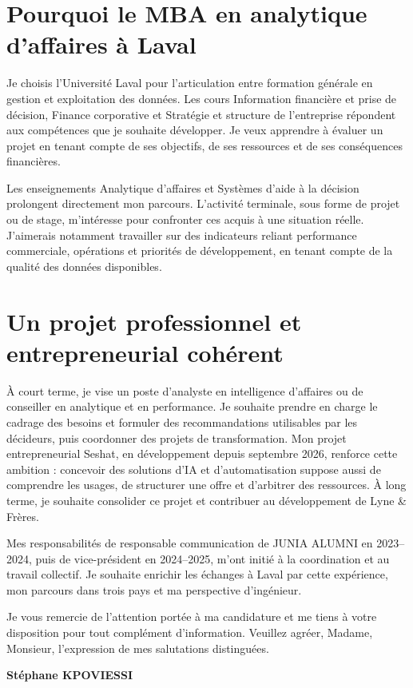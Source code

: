 \documentclass[12pt,a4paper]{article}
\begin{document}
\newpage
\section{Pourquoi le MBA en analytique d'affaires à Laval}

Je choisis l'Université Laval pour l'articulation entre formation générale en gestion et exploitation des données. Les cours Information financière et prise de décision, Finance corporative et Stratégie et structure de l'entreprise répondent aux compétences que je souhaite développer. Je veux apprendre à évaluer un projet en tenant compte de ses objectifs, de ses ressources et de ses conséquences financières.

Les enseignements Analytique d'affaires et Systèmes d'aide à la décision prolongent directement mon parcours. L'activité terminale, sous forme de projet ou de stage, m'intéresse pour confronter ces acquis à une situation réelle. J'aimerais notamment travailler sur des indicateurs reliant performance commerciale, opérations et priorités de développement, en tenant compte de la qualité des données disponibles.

\section{Un projet professionnel et entrepreneurial cohérent}

À court terme, je vise un poste d'analyste en intelligence d'affaires ou de conseiller en analytique et en performance. Je souhaite prendre en charge le cadrage des besoins et formuler des recommandations utilisables par les décideurs, puis coordonner des projets de transformation. Mon projet entrepreneurial Seshat, en développement depuis septembre 2026, renforce cette ambition : concevoir des solutions d'IA et d'automatisation suppose aussi de comprendre les usages, de structurer une offre et d'arbitrer des ressources. À long terme, je souhaite consolider ce projet et contribuer au développement de Lyne \& Frères.

Mes responsabilités de responsable communication de JUNIA ALUMNI en 2023--2024, puis de vice-président en 2024--2025, m'ont initié à la coordination et au travail collectif. Je souhaite enrichir les échanges à Laval par cette expérience, mon parcours dans trois pays et ma perspective d'ingénieur.

Je vous remercie de l'attention portée à ma candidature et me tiens à votre disposition pour tout complément d'information. Veuillez agréer, Madame, Monsieur, l'expression de mes salutations distinguées.

\vspace{0.4em}
{\bfseries Stéphane KPOVIESSI}
\end{document}
